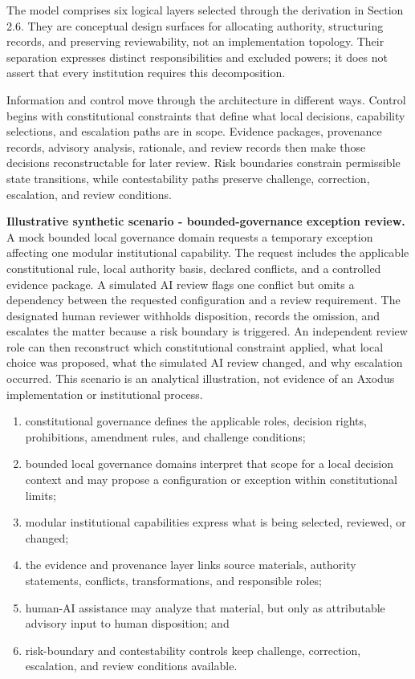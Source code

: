 \documentclass[11pt]{article}
\begin{document}
The model comprises six logical layers selected through the derivation in
Section 2.6. They are conceptual design surfaces for allocating authority,
structuring records, and preserving reviewability, not an implementation
topology. Their separation expresses distinct responsibilities and excluded
powers; it does not assert that every institution requires this decomposition.

Information and control move through the architecture in different ways.
Control begins with constitutional constraints that define what local
decisions, capability selections, and escalation paths are in scope.
Evidence packages, provenance records, advisory analysis, rationale, and
review records then make those decisions reconstructable for later review.
Risk boundaries constrain permissible state transitions, while contestability
paths preserve challenge, correction, escalation, and review conditions.

\noindent\textbf{Illustrative synthetic scenario - bounded-governance
exception review.} A mock bounded local governance domain requests a
temporary exception affecting one modular institutional capability. The
request includes the applicable constitutional rule, local authority basis,
declared conflicts, and a controlled evidence package. A simulated AI review
flags one conflict but omits a dependency between the requested
configuration and a review requirement. The designated human reviewer
withholds disposition, records the omission, and escalates the matter because
a risk boundary is triggered. An independent review role can then reconstruct
which constitutional constraint applied, what local choice was proposed, what
the simulated AI review changed, and why escalation occurred. This scenario
is an analytical illustration, not evidence of an Axodus implementation or
institutional process.

\begin{enumerate}[leftmargin=*]
\item constitutional governance defines the applicable roles, decision
rights, prohibitions, amendment rules, and challenge conditions;
\item bounded local governance domains interpret that scope for a local
decision context and may propose a configuration or exception within
constitutional limits;
\item modular institutional capabilities express what is being selected,
reviewed, or changed;
\item the evidence and provenance layer links source materials, authority
statements, conflicts, transformations, and responsible roles;
\item human-AI assistance may analyze that material, but only as attributable
advisory input to human disposition; and
\item risk-boundary and contestability controls keep challenge, correction,
escalation, and review conditions available.
\end{enumerate}
\end{document}

